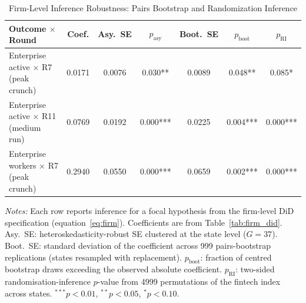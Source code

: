 \begin{table}[H]
\begin{threeparttable}
\caption{Firm-Level Inference Robustness: Pairs Bootstrap and Randomization Inference}
\label{atab:inference_robustness}
\small
\begin{tabular}{lcccccc}
\toprule
Outcome $\times$ Round & Coef. & Asy.\ SE & $p_{\text{asy}}$ & Boot.\ SE & $p_{\text{boot}}$ & $p_{\text{RI}}$ \\
\midrule
Enterprise active $\times$ R7 (peak crunch) & 0.0171 & 0.0076 & 0.030** & 0.0089 & 0.048** & 0.085* \\
Enterprise active $\times$ R11 (medium run) & 0.0769 & 0.0192 & 0.000*** & 0.0225 & 0.004*** & 0.000*** \\
Enterprise workers $\times$ R7 (peak crunch) & 0.2940 & 0.0550 & 0.000*** & 0.0659 & 0.002*** & 0.000*** \\
\bottomrule
\end{tabular}
\begin{tablenotes}
\footnotesize
\item \textit{Notes:} Each row reports inference for a focal hypothesis from the firm-level DiD specification (equation~\ref{eq:firm}). Coefficients are from Table~\ref{tab:firm_did}. Asy.\ SE: heteroskedasticity-robust SE clustered at the state level ($G=37$). Boot.\ SE: standard deviation of the coefficient across 999 pairs-bootstrap replications (states resampled with replacement). $p_{\text{boot}}$: fraction of centred bootstrap draws exceeding the observed absolute coefficient. $p_{\text{RI}}$: two-sided randomisation-inference $p$-value from 4999 permutations of the fintech index across states. $^{***}p<0.01$, $^{**}p<0.05$, $^{*}p<0.10$.
\end{tablenotes}
\end{threeparttable}
\end{table}
